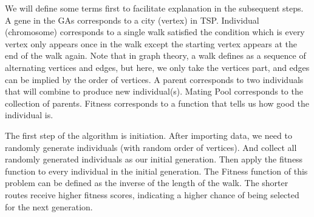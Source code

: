 \documentclass[letterpaper, 12 pt, conference]{ieeeconf}  %
\begin{document}
We will define some terms first to facilitate explanation in the subsequent steps. A gene in the GAs corresponds to a city (vertex) in TSP. Individual (chromosome) corresponds to a single walk satisfied the condition which is every vertex only appears once in the walk except the starting vertex appears at the end of the walk again. Note that in graph theory, a walk defines as a sequence of alternating vertices and edges, but here, we only take the vertices part, and edges can be implied by the order of vertices. A parent corresponds to two individuals that will combine to produce new individual(s). Mating Pool corresponds to the collection of parents. Fitness corresponds to a function that tells us how good the individual is.

The first step of the algorithm is initiation. After importing data, we need to randomly generate individuals (with random order of vertices). And collect all randomly generated individuals as our initial generation. Then apply the fitness function to every individual in the initial generation. The Fitness function of this problem can be defined as the inverse of the length of the walk. The shorter routes receive higher fitness scores, indicating a higher chance of being selected for the next generation.
\end{document}
